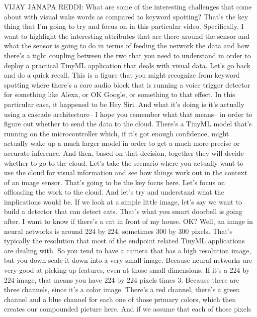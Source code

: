   VIJAY JANAPA REDDI: What are some of the interesting challenges that
  come about with visual wake words as compared to keyword spotting?
  That's the key thing that I'm going to try and focus on
  in this particular video.
  Specifically, I want to highlight the interesting attributes
  that are there around the sensor and what
  the sensor is going to do in terms of feeding the network the data
  and how there's a tight coupling between the two
  that you need to understand in order to deploy a practical TinyML
  application that deals with visual data.
  Let's go back and do a quick recall.
  This is a figure that you might recognize
  from keyword spotting where there's a core audio block that
  is running a voice trigger detector for something like Alexa,
  or OK Google, or something to that effect.
  In this particular case, it happened to be Hey Siri.
  And what it's doing is it's actually using a cascade architecture--
  I hope you remember what that means--
  in order to figure out whether to send the data to the cloud.
  There's a TinyML model that's running on the microcontroller which,
  if it's got enough confidence, might actually
  wake up a much larger model in order to get a much more
  precise or accurate inference.
  And then, based on that decision, together they
  will decide whether to go to the cloud.
  Let's take the scenario where you actually
  want to use the cloud for visual information
  and see how things work out in the context of an image sensor.
  That's going to be the key focus here.
  Let's focus on offloading the work to the cloud.
  And let's try and understand what the implications would be.
  If we look at a simple little image, let's
  say we want to build a detector that can detect cats.
  That's what you smart doorbell is going after.
  I want to know if there's a cat in front of my house.
  OK?
  Well, an image in neural networks is around 224
  by 224, sometimes 300 by 300 pixels.
  That's typically the resolution that most of the endpoint
  related TinyML applications are dealing with.
  So you tend to have a camera that has a high resolution image,
  but you down scale it down into a very small image.
  Because neural networks are very good at picking up
  features, even at those small dimensions.
  If it's a 224 by 224 image, that means you have 224 by 224 pixels times 3.
  Because there are three channels, since it's a color image.
  There's a red channel, there's a green channel and a blue channel
  for each one of those primary colors, which then creates our compounded
  picture here.
  And if we assume that each of those pixels
